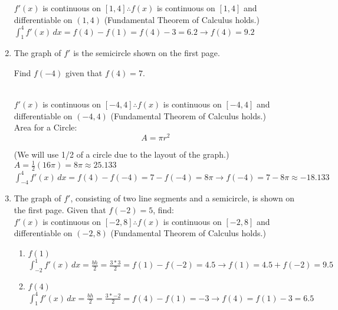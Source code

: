 \documentclass[10pt, letterpaper]{report}
\begin{document}
\begin{enumerate}
      $f' (x)$ is continuous on $[1,4]\therefore f(x)$ is continuous on $[1,4]$ and differentiable on $(1,4)$ (Fundamental Theorem of Calculus holds.) \\

      $\int_{1}^{4}{f'(x)}\,dx=
      f(4)-f(1)=f(4)-3=6.2\rightarrow f(4)=9.2$ \\
\pagebreak
    \item{The graph of $f'$ is the semicircle shown on the first page.

    Find $f(-4)$ given that $f(4)=7$.} \\

      $f' (x)$ is continuous on $[-4,4]\therefore f(x)$ is continuous on $[-4,4]$ and differentiable on $(-4,4)$ (Fundamental Theorem of Calculus holds.) \\

      Area for a Circle: \[ A=\pi r^2 \]

      (We will use 1/2 of a circle due to the layout of the graph.) \\

      $A=\frac{1}{2}(16\pi)=8\pi\approx 25.133$ \\

      $\int_{-4}^{4}{f'(x)}\,dx=
      f(4)-f(-4)=7-f(-4)=8\pi\rightarrow
      f(-4)=7-8\pi\approx-18.133$ \\

    \item{The graph of $f'$, consisting of two line segments and a semicircle, is shown on the first page. Given that $f(-2)=5$, find:} \\

      $f' (x)$ is continuous on $[-2,8]\therefore f(x)$ is continuous on $[-2,8]$ and differentiable on $(-2,8)$ (Fundamental Theorem of Calculus holds.)

      \begin{enumerate}
        \item{$f(1)$} \\

          $\int_{-2}^{1}{f'(x)}\,dx=
          \frac{bh}{2}=
          \frac{3*3}{2}=
          f(1)-f(-2)=
          4.5\rightarrow
          f(1)=4.5+f(-2)=9.5$ \\

        \item{$f(4)$} \\

          $\int_{1}^{4}{f'(x)}\,dx=
          \frac{bh}{2}=
          \frac{3*-2}{2}=
          f(4)-f(1)=
          -3\rightarrow
          f(4)=f(1)-3=6.5$ \\


\end{enumerate}
\end{enumerate}
\end{document}
